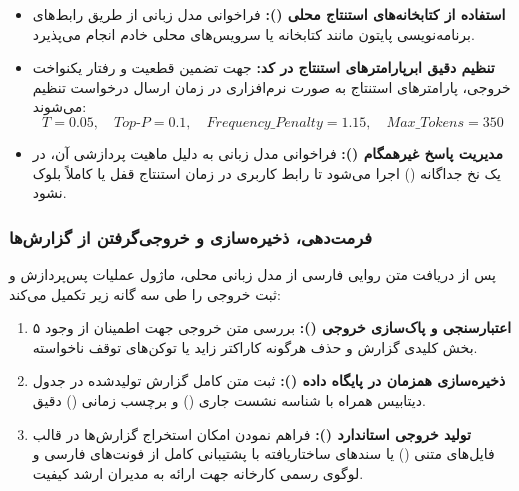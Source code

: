 \documentclass[a4paper, 10pt, twocolumn]{article}
\begin{document}
	\begin{itemize}
		\item \textbf{استفاده از کتابخانه‌های استنتاج محلی ():} فراخوانی مدل زبانی از طریق رابط‌های برنامه‌نویسی پایتون مانند کتابخانه  یا سرویس‌های محلی  خادم  انجام می‌پذیرد.
		\item \textbf{تنظیم دقیق ابرپارامترهای استنتاج در کد:} جهت تضمین قطعیت و رفتار یکنواخت خروجی، پارامترهای استنتاج به صورت نرم‌افزاری در زمان ارسال درخواست تنظیم می‌شوند:
		\begin{equation}
			T = 0.05, \quad Top\text{-}P = 0.1, \quad Frequency\_Penalty = 1.15, \quad Max\_Tokens = 350
		\end{equation}
		\item \textbf{مدیریت پاسخ غیرهمگام ():} فراخوانی مدل زبانی به دلیل ماهیت پردازشی آن، در یک نخ جداگانه () اجرا می‌شود تا رابط کاربری  در زمان استنتاج قفل یا کاملاً بلوک نشود.
	\end{itemize}
	
	\subsubsection{فرمت‌دهی، ذخیره‌سازی و خروجی‌گرفتن از گزارش‌ها}
	پس از دريافت متن روایی فارسی از مدل زبانی محلی، ماژول  عملیات پس‌پردازش و ثبت خروجی را طی سه گانه زیر تکمیل می‌کند:
	
	\begin{enumerate}
		\item \textbf{اعتبارسنجی و پاک‌سازی خروجی ():} بررسی متن خروجی جهت اطمینان از وجود ۵ بخش کلیدی گزارش و حذف هرگونه کاراکتر زاید یا توکن‌های توقف ناخواسته.
		\item \textbf{ذخیره‌سازی همزمان در پایگاه داده ():} ثبت متن کامل گزارش تولیدشده در جدول  دیتابیس  همراه با شناسه نشست جاری () و برچسب زمانی () دقیق.
		\item \textbf{تولید خروجی استاندارد ():} فراهم نمودن امکان استخراج گزارش‌ها در قالب فایل‌های متنی () یا سندهای ساختاریافته  با پشتیبانی کامل از فونت‌های فارسی و لوگوی رسمی کارخانه جهت ارائه به مدیران ارشد کیفیت.
	\end{enumerate}
	
\end{document}
